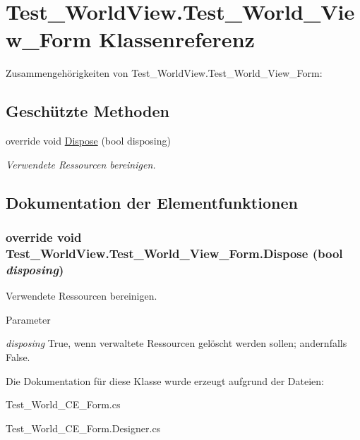 \hypertarget{class_test___world_view_1_1_test___world___view___form}{
\section{Test\_\-WorldView.Test\_\-World\_\-View\_\-Form Klassenreferenz}
\label{class_test___world_view_1_1_test___world___view___form}
}


Zusammengehörigkeiten von Test\_\-WorldView.Test\_\-World\_\-View\_\-Form:\subsection*{Geschützte Methoden}
\begin{DoxyCompactItemize}
\item 
override void \hyperlink{class_test___world_view_1_1_test___world___view___form_a58c32471c42109624080524e42837cf0}{Dispose} (bool disposing)
\begin{DoxyCompactList}\small\item\em Verwendete Ressourcen bereinigen. \item\end{DoxyCompactList}\end{DoxyCompactItemize}


\subsection{Dokumentation der Elementfunktionen}
\hypertarget{class_test___world_view_1_1_test___world___view___form_a58c32471c42109624080524e42837cf0}{
\subsubsection[{Dispose}]{\setlength{\rightskip}{0pt plus 5cm}override void Test\_\-WorldView.Test\_\-World\_\-View\_\-Form.Dispose (bool {\em disposing})}}
\label{class_test___world_view_1_1_test___world___view___form_a58c32471c42109624080524e42837cf0}


Verwendete Ressourcen bereinigen. 


\begin{DoxyParams}{Parameter}
\item[{\em disposing}]True, wenn verwaltete Ressourcen gelöscht werden sollen; andernfalls False.\end{DoxyParams}


Die Dokumentation für diese Klasse wurde erzeugt aufgrund der Dateien:\begin{DoxyCompactItemize}
\item 
Test\_\-World\_\-CE\_\-Form.cs\item 
Test\_\-World\_\-CE\_\-Form.Designer.cs\end{DoxyCompactItemize}
